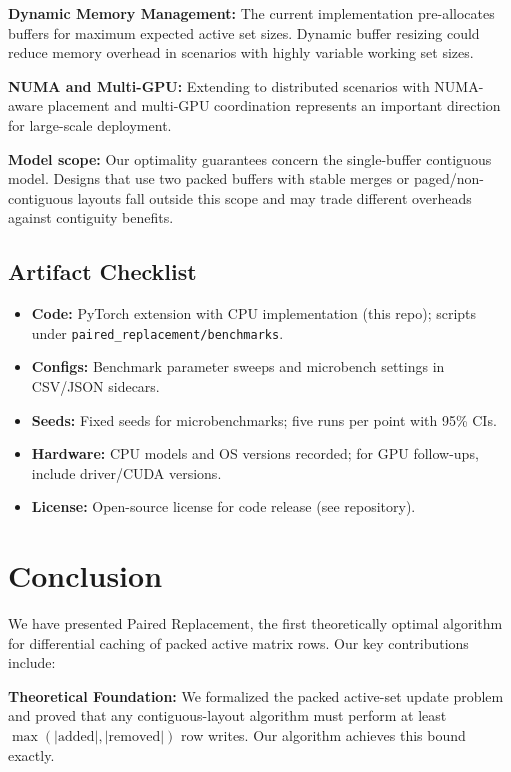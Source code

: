 \documentclass{article}
\numberwithin{equation}{section}
\theoremstyle{plain}
\theoremstyle{definition}
\theoremstyle{remark}
\begin{document}
\textbf{Dynamic Memory Management:} The current implementation pre-allocates buffers for maximum expected active set sizes. Dynamic buffer resizing could reduce memory overhead in scenarios with highly variable working set sizes.

\textbf{NUMA and Multi-GPU:} Extending to distributed scenarios with NUMA-aware placement and multi-GPU coordination represents an important direction for large-scale deployment.

\textbf{Model scope:} Our optimality guarantees concern the single-buffer contiguous model. Designs that use two packed buffers with stable merges or paged/non-contiguous layouts fall outside this scope and may trade different overheads against contiguity benefits.

\subsection{Artifact Checklist}

\begin{itemize}
  \item \textbf{Code:} PyTorch extension with CPU implementation (this repo); scripts under \texttt{paired\_replacement/benchmarks}.
  \item \textbf{Configs:} Benchmark parameter sweeps and microbench settings in CSV/JSON sidecars.
  \item \textbf{Seeds:} Fixed seeds for microbenchmarks; five runs per point with 95\% CIs.
  \item \textbf{Hardware:} CPU models and OS versions recorded; for GPU follow-ups, include driver/CUDA versions.
  \item \textbf{License:} Open-source license for code release (see repository).
\end{itemize}

\section{Conclusion} \label{sec:conclusion}

We have presented Paired Replacement, the first theoretically optimal algorithm for differential caching of packed active matrix rows. Our key contributions include:

\textbf{Theoretical Foundation:} We formalized the packed active-set update problem and proved that any contiguous-layout algorithm must perform at least $\max(|\text{added}|, |\text{removed}|)$ row writes. Our algorithm achieves this bound exactly.
\end{document}
